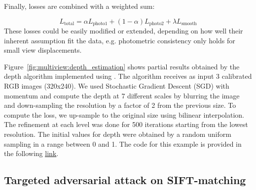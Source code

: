 Finally, losses are combined with a weighted sum:

\begin{equation}
   	\label{eq:multiview:loss total}
	L_{\text{total}} = \alpha L_{\text{photo1}} + (1 - \alpha) L_{\text{photo2}} + \lambda L_{\text{smooth}} 
\end{equation}
These losses could be easily modified or extended, depending on how well their inherent  assumption fit the data, e.g. photometric consistency only holds for small view displacements.


Figure~\ref{fig:multiview:depth_estimation} shows partial results obtained by the depth algorithm implemented using \lib. The algorithm receives as input 3 calibrated RGB images (320x240). We used Stochastic Gradient Descent (SGD) with momentum and compute the depth at 7 different scales by blurring the image and down-sampling the resolution by a factor of 2 from the previous size. To compute the loss, we up-sample  to the original size using bilinear interpolation.  The refinement at each level was done for 500 iterations starting from the lowest resolution. The initial values for depth were obtained by a random uniform sampling in a range between 0 and 1. The code for this example is provided in the following \underline{\color{blue}\href{https://github.com/kornia/kornia-examples/blob/master/depth_estimation.ipynb}{link}}.

\subsection{Targeted adversarial attack on SIFT-matching}
\label{section:use_cases:adversarial_matching}

